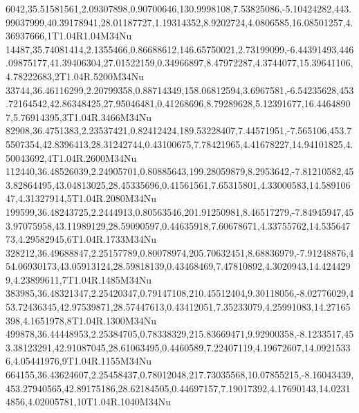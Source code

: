 6042,35.51581561,2.09307898,0.90700646,130.9998108,7.53825086,-5.10424282,443.99037999,40.39178941,28.01187727,1.19314352,8.9202724,4.0806585,16.08501257,4.36937666,1T1.04R1.04M34Nu
14487,35.74081414,2.1355466,0.86688612,146.65750021,2.73199099,-6.44391493,446.09875177,41.39406304,27.01522159,0.34966897,8.47972287,4.3744077,15.39641106,4.78222683,2T1.04R.5200M34Nu
33744,36.46116299,2.20799358,0.88714349,158.06812594,3.6967581,-6.54235628,453.72164542,42.86348425,27.95046481,0.41268696,8.79289628,5.12391677,16.44648907,5.76914395,3T1.04R.3466M34Nu
82908,36.4751383,2.23537421,0.82412424,189.53228407,7.44571951,-7.565106,453.75507354,42.8396413,28.31242744,0.43100675,7.78421965,4.41678227,14.94101825,4.50043692,4T1.04R.2600M34Nu
112440,36.48526039,2.24905701,0.80885643,199.28059879,8.2953642,-7.81210582,453.82864495,43.04813025,28.45335696,0.41561561,7.65315801,4.33000583,14.58910647,4.31327914,5T1.04R.2080M34Nu
199599,36.48243725,2.2444913,0.80563546,201.91250981,8.46517279,-7.84945947,453.97075958,43.11989129,28.59090597,0.44635918,7.60678671,4.33755762,14.53564773,4.29582945,6T1.04R.1733M34Nu
328212,36.49688847,2.25157789,0.80078974,205.70632451,8.68836979,-7.91248876,454.06930173,43.05913124,28.59818139,0.43468469,7.47810892,4.3020943,14.4244299,4.23899611,7T1.04R.1485M34Nu
383985,36.48321347,2.25420347,0.79147108,210.45512404,9.30118056,-8.02776029,453.72436345,42.97539871,28.57447613,0.43412051,7.35233079,4.25991083,14.27165398,4.1651978,8T1.04R.1300M34Nu
499878,36.44448953,2.25384705,0.78338329,215.83669471,9.92900358,-8.1233517,453.38123291,42.91087045,28.61063495,0.4460589,7.22407119,4.19672607,14.09215336,4.05441976,9T1.04R.1155M34Nu
664155,36.43624607,2.25458437,0.78012048,217.73035568,10.07855215,-8.16043439,453.27940565,42.89175186,28.62184505,0.44697157,7.19017392,4.17690143,14.02314856,4.02005781,10T1.04R.1040M34Nu
